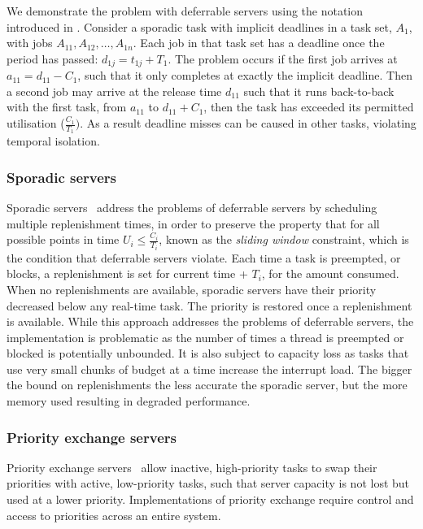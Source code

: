 We demonstrate the problem with deferrable servers using the notation introduced in
. Consider a sporadic task with implicit deadlines in a task set, 
$A_{1}$, with jobs $A_{11}, A_{12}, \ldots, A_{1n}$. Each job in that task set has a deadline once the
period has passed: $d_{1j} = t_{1j} + T_{1}$. The problem occurs if the first job arrives at $a_{11}
= d_{11}-C_{1}$, such that it only completes at exactly the implicit deadline.  
Then a second job may arrive at the release time $d_{11}$ such that it runs back-to-back with the first
task, from $a_11$ to $d_{11} + C_{1}$, then the task has exceeded its permitted utilisation 
($\frac{C_{1}}{T_{1}})$. As a result deadline misses can be caused in other
tasks, violating temporal isolation.

\subsubsection{Sporadic servers}
\label{p:sporadic} 

Sporadic servers~\citep{Sprunt_SL_89a} address the problems of
deferrable servers by scheduling multiple replenishment times, in order to preserve the property
that for all possible points in time $U_{i} \leq \frac{C_{i}}{T_{i}}$, known as the \emph{sliding window} constraint, which
is the condition that deferrable servers violate.  Each time a task is preempted, or blocks, a
replenishment is set for current time + $T_{i}$, for the amount consumed.  When no replenishments are
available, sporadic servers have their priority decreased below any real-time task.  The priority is
restored once a replenishment is available.  While this approach addresses the problems of deferrable
servers, the implementation is problematic as the number of times a thread is preempted or blocked
is potentially unbounded.  It is also subject to capacity loss as tasks that use very small chunks
of budget at a time increase the interrupt load.  The bigger the bound on replenishments the less
accurate the sporadic server, but the more memory used resulting in degraded performance.

\subsubsection{Priority exchange servers}

Priority exchange servers~\citep{Sprunt_SL_89a, Spuri_Buttazzo_94} allow inactive, high-priority tasks to swap their
priorities with active, low-priority tasks, such that server capacity is not lost but used at a lower
priority. Implementations of priority exchange require control and access to priorities across an
entire system.

